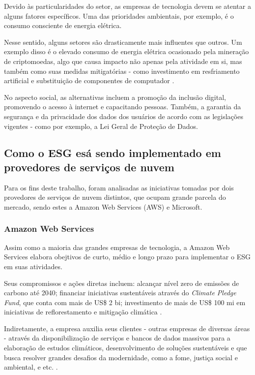 \documentclass[12pt]{article}
\begin{document}
	Devido às particularidades do setor, as empresas de tecnologia devem se atentar a alguns fatores específicos. Uma das prioridades ambientais, por exemplo, é o consumo consciente de energia elétrica.
	
	Nesse sentido, alguns setores são drasticamente mais influentes que outros. Um exemplo disso é o elevado consumo de energia elétrica ocasionado pela mineração de criptomoedas, algo que causa impacto não apenas pela atividade em si, mas também como suas medidas mitigatórias - como investimento em resfriamento artificial e substituição de componentes de computador \cite{kohliAnalysisEnergyConsumption2023}.
	
	No aspecto social, as alternativas incluem a promoção da inclusão digital, promovendo o acesso à internet e capacitando pessoas. Também, a garantia da segurança e da privacidade dos dados dos usuários de acordo com as legislações vigentes - como  por exemplo, a Lei Geral de Proteção de Dados.
	
	\subsection*{Como o ESG esá sendo implementado em provedores de serviços de nuvem}
	
	Para os fins deste trabalho, foram analisadas as iniciativas tomadas por dois provedores de serviços de nuvem distintos, que ocupam grande parcela do mercado, sendo estes a Amazon Web Services (AWS) e Microsoft.
	
	\subsubsection*{Amazon Web Services}
	
	Assim como a maioria das grandes empresas de tecnologia, a Amazon Web Services elabora obejtivos de curto, médio e longo prazo para implementar o ESG em suas atividades.
	
	Seus compromissos e ações diretas incluem: alcançar nível zero de emissões de carbono até 2040; financiar iniciativas sustentáveis através do \emph{Climate Pledge Fund}, que conta com mais de US\$ 2 bi; investimento de mais de US\$ 100 mi em iniciativas de reflorestamento e mitigação climática \cite{amazonwebservicesClimateConnections2022}.
	
	Indiretamente, a empresa auxilia seus clientes - outras empresas de diversas áreas - através da disponibilização de serviços e bancos de dados massivos para a elaboração de estudos climáticos, desenvolvimento de soluções sustentáveis e que busca resolver grandes desafios da modernidade, como a fome, justiça social e ambiental, e etc. \cite{amazonwebservicesClimateConnections2022}.
	
\end{document}
